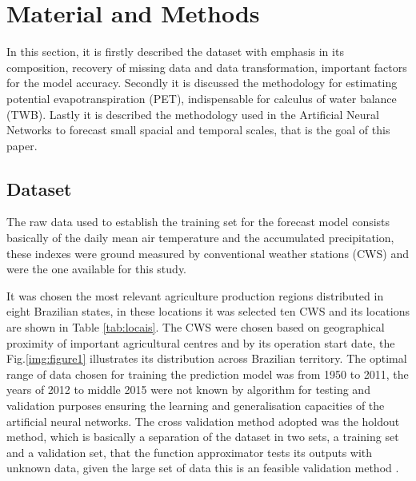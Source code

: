 \chapter{Material and Methods}
\label{cap:linux}
\vspace{-2cm}

In this section, it is firstly described the dataset with emphasis in its composition, recovery of missing data and data transformation, important factors for the model accuracy. Secondly it is discussed the methodology for estimating potential evapotranspiration (PET), indispensable for calculus of water balance (TWB).
Lastly it is described the methodology used in the Artificial Neural Networks to forecast small spacial and temporal scales, that is the goal of this paper.

\section{Dataset}

The raw data used to establish the training set for the forecast model consists basically of the daily mean air temperature and the accumulated precipitation, these indexes were ground measured by conventional weather stations (CWS) and were the one available for this study.

It was chosen the most relevant agriculture production regions distributed in eight Brazilian states, in these locations it was selected ten CWS and its locations are shown in Table \ref{tab:locais}. 
The CWS were chosen based on geographical proximity of important agricultural centres and by its operation start date, the Fig.\ref{img:figure1} illustrates its distribution across Brazilian territory. The optimal range of data chosen for training the prediction model was from 1950 to 2011, the years of 2012 to middle 2015 were not known by algorithm for testing and validation purposes ensuring the learning and generalisation capacities of the artificial neural networks. The cross validation method adopted was the holdout method, which is basically a separation of the dataset in two sets, a training set and a validation set, that the function approximator tests its outputs with unknown data, given the large set of data this is an feasible validation method \cite{friedman2001elements}.

